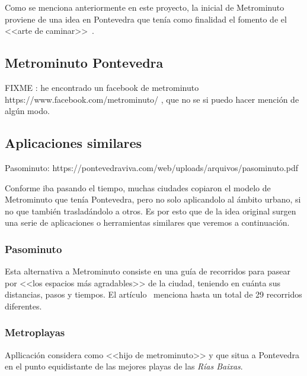
Como se menciona anteriormente en este proyecto, la inicial de Metrominuto proviene de una idea en Pontevedra que tenía como finalidad el fomento de el <<arte de caminar>>~\cite{wiki:metrominuto-pontevedra}.



\subsection{Metrominuto Pontevedra}
FIXME : he encontrado un facebook de metrominuto https://www.facebook.com/metrominuto/  , que no se si puedo hacer mención de algún modo.


\subsection{Aplicaciones similares}
Pasominuto: https://pontevedraviva.com/web/uploads/arquivos/pasominuto.pdf

Conforme iba pasando el tiempo, muchas ciudades copiaron el modelo de Metrominuto que tenía Pontevedra, pero no solo aplicandolo al ámbito urbano, si no que también trasladándolo a otros. Es por esto que de la idea original surgen una serie de aplicaciones o herramientas similares que veremos a continuación.

\subsubsection{Pasominuto}
Esta alternativa a Metrominuto consiste en una guía de recorridos para pasear por <<los espacios más agradables>> de la ciudad, teniendo en cuánta sus distancias, pasos y tiempos. El artículo~\cite{art:pasominuto} menciona hasta un total de 29 recorridos diferentes.

\subsubsection{Metroplayas}
Apllicación considera como <<hijo de metrominuto>> y que situa a Pontevedra en el punto equidistante de las mejores playas de las \textit{Rías Baixas}.
